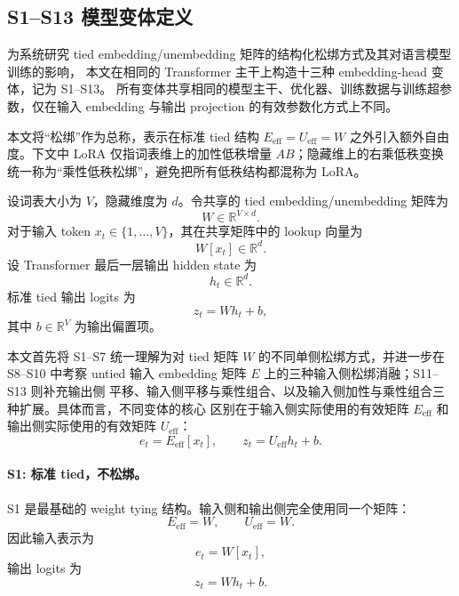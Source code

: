 
\subsection{S1--S13 模型变体定义}

为系统研究 tied embedding/unembedding 矩阵的结构化松绑方式及其对语言模型训练的影响，
本文在相同的 Transformer 主干上构造十三种 embedding-head 变体，记为 S1--S13。
所有变体共享相同的模型主干、优化器、训练数据与训练超参数，仅在输入 embedding
与输出 projection 的有效参数化方式上不同。

本文将“松绑”作为总称，表示在标准 tied 结构 $E_{\mathrm{eff}}=U_{\mathrm{eff}}=W$
之外引入额外自由度。下文中 LoRA 仅指词表维上的加性低秩增量
$AB$；隐藏维上的右乘低秩变换统一称为“乘性低秩松绑”，避免把所有低秩结构都混称为
LoRA。

设词表大小为 $V$，隐藏维度为 $d$。令共享的 tied embedding/unembedding 矩阵为
\begin{equation}
    W \in \mathbb{R}^{V \times d}.
\end{equation}
对于输入 token $x_t \in \{1,\dots,V\}$，其在共享矩阵中的 lookup 向量为
\begin{equation}
    W[x_t] \in \mathbb{R}^{d}.
\end{equation}
设 Transformer 最后一层输出 hidden state 为
\begin{equation}
    h_t \in \mathbb{R}^{d}.
\end{equation}
标准 tied 输出 logits 为
\begin{equation}
    z_t = W h_t + b,
\end{equation}
其中 $b \in \mathbb{R}^{V}$ 为输出偏置项。

本文首先将 S1--S7 统一理解为对 tied 矩阵 $W$ 的不同单侧松绑方式，并进一步在 S8--S10
中考察 untied 输入 embedding 矩阵 $E$ 上的三种输入侧松绑消融；S11--S13 则补充输出侧
平移、输入侧平移与乘性组合、以及输入侧加性与乘性组合三种扩展。具体而言，不同变体的核心
区别在于输入侧实际使用的有效矩阵 $E_{\mathrm{eff}}$ 和输出侧实际使用的有效矩阵
$U_{\mathrm{eff}}$：
\begin{equation}
    e_t = E_{\mathrm{eff}}[x_t], \qquad
    z_t = U_{\mathrm{eff}} h_t + b.
\end{equation}

\paragraph{S1: 标准 tied，不松绑。}
S1 是最基础的 weight tying 结构。输入侧和输出侧完全使用同一个矩阵：
\begin{equation}
    E_{\mathrm{eff}} = W, \qquad
    U_{\mathrm{eff}} = W.
\end{equation}
因此输入表示为
\begin{equation}
    e_t = W[x_t],
\end{equation}
输出 logits 为
\begin{equation}
    z_t = W h_t + b.
\end{equation}

